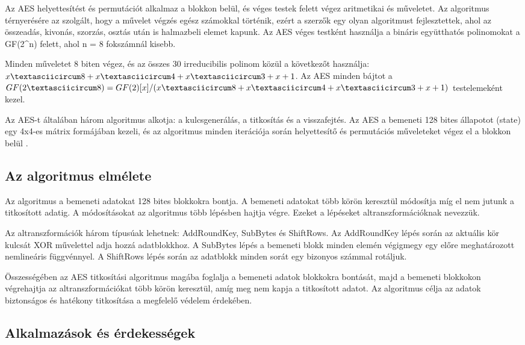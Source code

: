 Az AES helyettesítést és permutációt alkalmaz a blokkon belül, és véges testek felett végez aritmetikai és műveletet. Az algoritmus térnyerésére az szolgált, hogy a művelet végzés egész számokkal történik, ezért a szerzők egy olyan algoritmust fejlesztettek, ahol az összeadás, kivonás, szorzás, osztás után is halmazbeli elemet kapunk. Az AES véges testként használja a bináris együtthatós polinomokat a GF(2\textasciicircum n) felett, ahol n = 8 fokszámnál kisebb.

Minden műveletet 8 biten végez, és az összes 30 irreducibilis polinom közül a következőt használja: $x\textasciicircum 8 + x\textasciicircum 4 + x\textasciicircum 3 + x + 1$. Az AES minden bájtot a $GF(2\textasciicircum 8) = GF(2)[x]/(x\textasciicircum 8 + x\textasciicircum 4 + x\textasciicircum 3 + x + 1)$ testelemeként kezel.

Az AES-t általában három algoritmus alkotja: a kulcsgenerálás, a titkosítás és a visszafejtés. Az AES a bemeneti 128 bites állapotot (state) egy 4x4-es mátrix formájában kezeli, és az algoritmus minden iterációja során helyettesítő és permutációs műveleteket végez el a blokkon belül \cite{Marton}.

\subsection {Az algoritmus elmélete}

Az algoritmus a bemeneti adatokat 128 bites blokkokra bontja. A bemeneti adatokat több körön keresztül módosítja míg el nem jutunk a titkosított adatig. A módosításokat az algoritmus több lépésben hajtja végre. Ezeket a lépéseket altranszformációknak nevezzük.

Az altranszformációk három típusúak lehetnek: AddRoundKey, SubBytes és ShiftRows. Az AddRoundKey lépés során az aktuális kör kulcsát XOR művelettel adja hozzá adatblokkhoz. A SubBytes lépés a bemeneti blokk minden elemén végigmegy egy előre meghatározott nemlineáris függvénnyel. A ShiftRows lépés során az adatblokk minden sorát egy bizonyos számmal rotáljuk.

Összességében az AES titkosítási algoritmus magába foglalja a bemeneti adatok blokkokra bontását, majd a bemeneti blokkokon végrehajtja az altranszformációkat több körön keresztül, amíg meg nem kapja a titkosított adatot. Az algoritmus célja az adatok biztonságos és hatékony titkosítása a megfelelő védelem érdekében.

\subsection{Alkalmazások és érdekességek}


